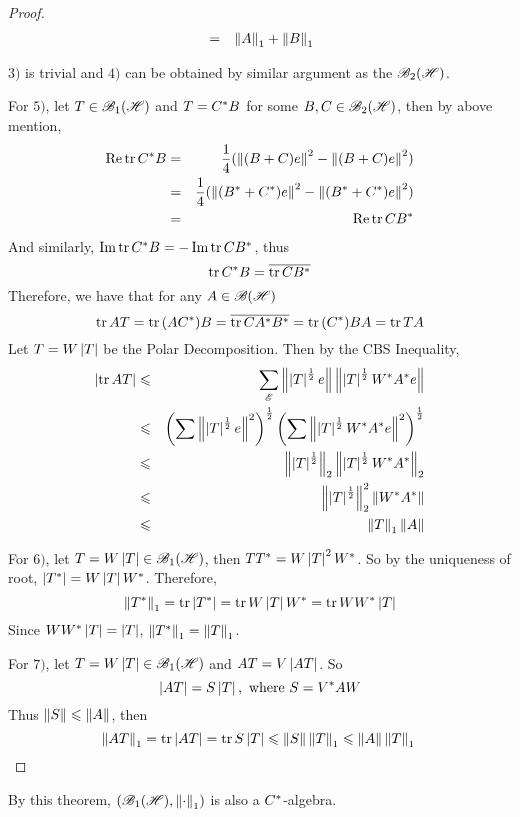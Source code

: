 \begin{proof}
\begin{eqnarray*}
		&=& \norm{A}_1 + \norm{B}_1
	\end{eqnarray*}
	\item $3)$ is trivial and $4)$ can be obtained by similar argument as the $\hoper$.
	\item For $5)$, let $T \in \toper$ and $T = \st{C}B$ for some $B,C \in \hoper$, then by above mention,
	\begin{eqnarray*}
		\Rea{\tr{\st{C}B}} &=& \frac{1}{4} (\norm{(B+C)e}^2 - \norm{(B+C)e}^2) \\
		&=& \frac{1}{4} (\norm{(\st{B}+\st{C})e}^2 - \norm{(\st{B}+\st{C})e}^2) \\
		&=& \Rea{\tr{C\st{B}}}
	\end{eqnarray*}
	And similarly, $\Img{\tr{\st{C}B}} = - \Img{\tr{C\st{B}}}$, thus
	\begin{equation*}
		\tr{\st{C}B} = \clo{\tr{C\st{B}}}
	\end{equation*}
	Therefore, we have that for any $A \in \oper$ 
	\begin{equation*}
		\tr{AT} = \tr{(A\st{C})B} = \clo{\tr{C\st{A} \st{B}}} = \tr{(\st{C})BA} = \tr{TA}
	\end{equation*}
	Let $T = W \abs{T}$ be the Polar Decomposition. Then by the CBS Inequality,
	\begin{eqnarray*}
		\abs{\tr{AT}} &\leqslant& \sum_{\fml{E}}  \norm{\abs{T}^{\frac{1}{2}}e}\norm{\abs{T}^{\frac{1}{2}}\st{W}\st{A}e} \\
		&\leqslant& \left(\sum \norm{\abs{T}^{\frac{1}{2}}e}^2 \right)^{\frac{1}{2}}\left(\sum \norm{\abs{T}^{\frac{1}{2}}\st{W}\st{A}e}^2 \right)^{\frac{1}{2}} \\
		&\leqslant& \norm{\abs{T}^{\frac{1}{2}}}_2\norm{\abs{T}^{\frac{1}{2}}\st{W}\st{A}}_2 \\
		&\leqslant& \norm{\abs{T}^{\frac{1}{2}}}_2^2 \norm{\st{W}\st{A}} \\
		&\leqslant& \norm{T}_1 \norm{A}
	\end{eqnarray*}
	\item For $6)$, let $T = W \abs{T} \in \toper$, then $T\st{T} = W \abs{T}^2 \st{W}$. So by the uniqueness of root, $\abs{\st{T}} = W \abs{T} \st{W}$. Therefore,
	\begin{equation*}
		\norm{\st{T}}_1 = \tr{\abs{\st{T}}} = \tr{W \abs{T} \st{W}} = \tr{W \st{W} \abs{T}}
	\end{equation*} 
	Since $W \st{W} \abs{T} = \abs{T}$, $\norm{\st{T}}_1 = \norm{T}_1$.
	\item For $7)$, let $T = W \abs{T} \in \toper$ and $AT = V \abs{AT}$. So
	\begin{equation*}
		\abs{AT} = S \abs{T}, \text{ where } S = \st{V}A W
	\end{equation*}
	Thus $\norm{S} \leqslant \norm{A}$, then
	\begin{equation*}
		\norm{AT}_1 = \tr{\abs{AT}} = \tr{S \abs{T}} \leqslant \norm{S} \norm{T}_1 \leqslant \norm{A}\norm{T}_1 \qedhere
	\end{equation*}
\end{proof}
\begin{rem}
	By this theorem, $(\toper, \norm{\cdot}_1)$ is also a $\st{C}$-algebra.
\end{rem}

